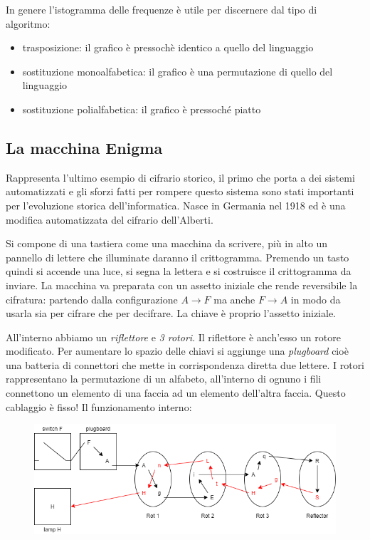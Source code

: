 In genere l'istogramma delle frequenze è utile per discernere dal tipo di algoritmo:
\begin{itemize}
    \item trasposizione: il grafico è pressochè identico a quello del linguaggio
    \item sostituzione monoalfabetica: il grafico è una permutazione di quello del linguaggio
    \item sostituzione polialfabetica: il grafico è pressoché piatto
\end{itemize}

\subsection{La macchina Enigma}
Rappresenta l'ultimo esempio di cifrario storico, il primo che porta a dei sistemi automatizzati e gli sforzi fatti per rompere questo sistema sono stati importanti per l'evoluzione storica dell'informatica. Nasce in Germania nel 1918 ed è una modifica automatizzata del cifrario dell'Alberti.

Si compone di una tastiera come una macchina da scrivere, più in alto un pannello di lettere che illuminate daranno il crittogramma. Premendo un tasto quindi si accende una luce, si segna la lettera e si costruisce il crittogramma da inviare. La macchina va preparata con un assetto iniziale che rende reversibile la cifratura: partendo dalla configurazione $A \xrightarrow{} F$ ma anche $F \xrightarrow{} A$ in modo da usarla sia per cifrare che per decifrare. La chiave è proprio l'assetto iniziale.

All'interno abbiamo un \emph{riflettore} e \emph{3 rotori}. Il riflettore è anch'esso un rotore modificato. Per aumentare lo spazio delle chiavi si aggiunge una \emph{plugboard} cioè una batteria di connettori che mette in corrispondenza diretta due lettere. I rotori rappresentano la permutazione di un alfabeto, all'interno di ognuno i fili connettono un elemento di una faccia ad un elemento dell'altra faccia. Questo cablaggio è fisso!
Il funzionamento interno:

\begin{figure}[H]
  \centering
  \includegraphics[width = 350pt]{Enigma.png}
\end{figure}

